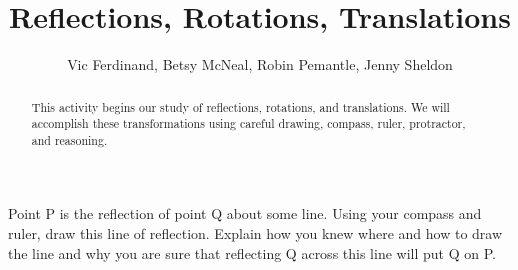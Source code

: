 \documentclass{ximera}
\title{Reflections, Rotations, Translations}
\author{Vic Ferdinand, Betsy McNeal, Robin Pemantle, Jenny Sheldon}
\begin{document}
\begin{abstract}This activity begins our study of reflections, rotations, and translations.  We will accomplish these transformations using careful drawing, compass, ruler, protractor, and reasoning.
\end{abstract}
\maketitle



\begin{problem}
Point P is the reflection of point Q about some line.  Using your compass and ruler, draw this line of reflection.  Explain how you knew where and how to draw the line and why you are sure that reflecting Q across this line will put Q on P.\\
\vskip 2in

\vfill
\begin{center}
\end{center}


\vfill


\end{problem}
\end{document}
